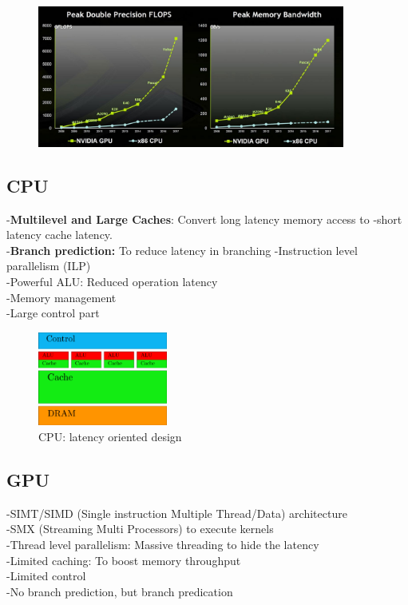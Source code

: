 \begin{figure}[ht]
	\centering
	\includegraphics[width=0.9\textwidth]{figure_parallel/computing_power_comparison.png}\end{figure}
\FloatBarrier

\subsection{CPU}

-\textbf{Multilevel and Large Caches}: Convert long latency memory access to -short latency cache latency.\\
-\textbf{Branch prediction:} To reduce latency in branching
-Instruction level parallelism (ILP)\\
-Powerful ALU: Reduced operation latency\\
-Memory management\\
-Large control part\\

\begin{figure}[ht]
	\centering
	\includegraphics[width=0.38\textwidth]{figure_parallel/CPU.png}
	\caption{CPU: latency oriented design}
\end{figure}
\FloatBarrier

\subsection{GPU}

-SIMT/SIMD (Single instruction Multiple Thread/Data) architecture\\
-SMX (Streaming Multi Processors) to execute kernels\\
-Thread level parallelism: Massive threading to hide the latency\\
-Limited caching: To boost memory throughput\\
-Limited control\\
-No branch prediction, but branch predication

